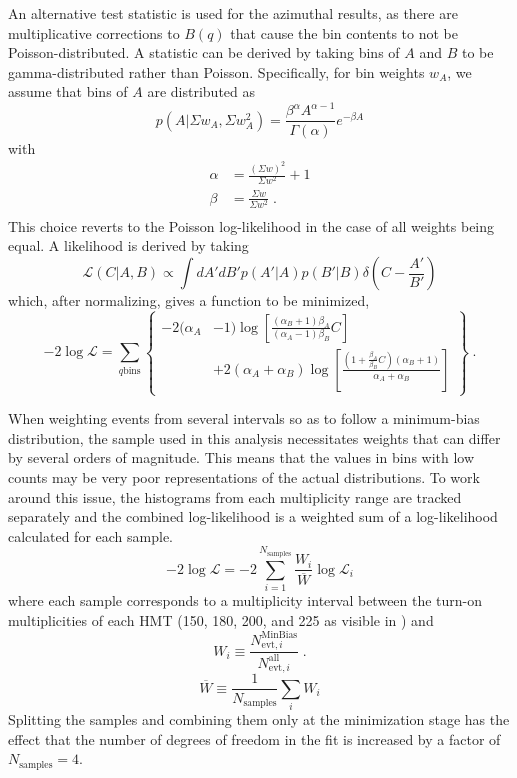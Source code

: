 An alternative test statistic is used for the azimuthal results, as there are multiplicative corrections to $B(q)$ that cause the bin contents to not be Poisson-distributed.
A statistic can be derived by taking bins of $A$ and $B$ to be gamma-distributed rather than Poisson.
Specifically, for bin weights $w_A$, we assume that bins of $A$ are distributed as
\begin{equation}
  p\left(A|\Sigma w_A, \Sigma w_A^2 \right) = \frac{\beta^\alpha A^{\alpha-1}}{\Gamma (\alpha)}e^{-\beta A}
\end{equation}
with
\begin{align*}
  \alpha &= \frac{(\Sigma w)^2}{\Sigma w^2} + 1\\
  \beta &= \frac{\Sigma w}{\Sigma w^2} \; .\\
\end{align*}
This choice reverts to the Poisson log-likelihood in the case of all weights being equal.
A likelihood is derived by taking
\begin{equation}
  \mathcal{L}\left( C | A,B \right) \propto \int dA' dB' p\left(A'|A\right) p\left(B'|B\right) \delta\left(C - \frac{A'}{B'}\right)
\end{equation}
which, after normalizing, gives a function to be minimized,
\begin{equation}
    -2\log\mathcal{L} = \sum_{q \textrm{bins}} \left\{\begin{split} -2(\alpha_A &- 1) \log \left[ \frac{(\alpha_B +1)\beta_A}{(\alpha_A - 1)\beta_B} C \right] \\ &+ 2(\alpha_A + \alpha_B) \log \left[ \frac{\left( 1 + \frac{\beta_A}{\beta_B} C\right)(\alpha_B + 1)}{\alpha_A + \alpha_B} \right] \end{split} \right\} \; .
\end{equation}

When weighting events from several \Nch intervals so as to follow a minimum-bias distribution, the sample used in this analysis necessitates weights that can differ by several orders of magnitude.
This means that the values in bins with low counts may be very poor representations of the actual distributions.
To work around this issue, the histograms from each multiplicity range are tracked separately and the combined log-likelihood is a weighted sum of a log-likelihood calculated for each sample.
\begin{equation}
  -2\log\mathcal{L} = -2 \sum_{i=1}^{N_\textrm{samples}} \frac{W_i}{\overline{W}} \log\mathcal{L}_i
\end{equation}
where each sample corresponds to a multiplicity interval between the turn-on multiplicities of each \ac{HMT} (150, 180, 200, and 225 as visible in \Fig{\ref{fig:nch}}) and
\[
W_i \equiv \frac{N_{\textrm{evt},i}^\textrm{MinBias}}{N_{\textrm{evt},i}^\textrm{all}} \; .
\]
\[ \overline{W} \equiv \frac{1}{N_\textrm{samples}} \sum_i W_i \]
Splitting the samples and combining them only at the minimization stage has the effect that the number of degrees of freedom in the fit is increased by a factor of $N_\textrm{samples} = 4$.

